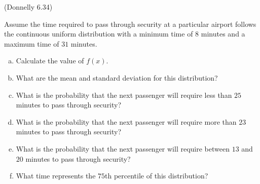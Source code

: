 \documentclass[12pt, letterpaper]{article}
\newcounter{exercise}
\theoremstyle{definition}
\begin{document}
\newpage

\begin{exercise}  (Donnelly 6.34)

Assume the time required to pass through security at a particular airport follows the continuous uniform distribution with a minimum time of $8$ minutes and a maximum time of $31$ minutes.

\end{exercise}

\begin{enumerate}[(a)]

\item Calculate the value of $f(x)$.

\vfill

\item What are the mean and standard deviation for this distribution?

\vfill

\item What is the probability that the next passenger will require less than $25$ minutes to pass through security?

\vfill

\item What is the probability that the next passenger will require more than $23$ minutes to pass through security?

\vfill

\item What is the probability that the next passenger will require between $13$ and $20$ minutes to pass through security?

\vfill

\item What time represents the $75$th percentile of this distribution?

\vfill
\vfill

\end{enumerate}
\end{document}
